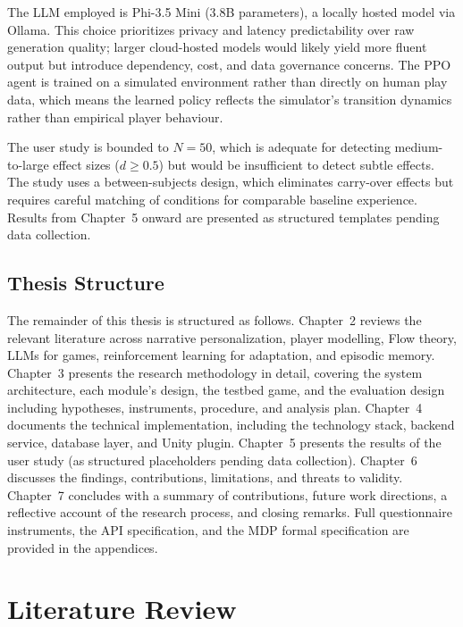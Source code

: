 \documentclass[12pt,a4paper]{report}
\begin{document}
The LLM employed is Phi-3.5 Mini (3.8B parameters), a locally hosted model via Ollama. This choice prioritizes privacy and latency predictability over raw generation quality; larger cloud-hosted models would likely yield more fluent output but introduce dependency, cost, and data governance concerns. The PPO agent is trained on a simulated environment rather than directly on human play data, which means the learned policy reflects the simulator's transition dynamics rather than empirical player behaviour.

The user study is bounded to $N = 50$, which is adequate for detecting medium-to-large effect sizes ($d \geq 0.5$) but would be insufficient to detect subtle effects. The study uses a between-subjects design, which eliminates carry-over effects but requires careful matching of conditions for comparable baseline experience. Results from Chapter~5 onward are presented as structured templates pending data collection.

\section{Thesis Structure}

The remainder of this thesis is structured as follows. Chapter~2 reviews the relevant literature across narrative personalization, player modelling, Flow theory, LLMs for games, reinforcement learning for adaptation, and episodic memory. Chapter~3 presents the research methodology in detail, covering the system architecture, each module's design, the testbed game, and the evaluation design including hypotheses, instruments, procedure, and analysis plan. Chapter~4 documents the technical implementation, including the technology stack, backend service, database layer, and Unity plugin. Chapter~5 presents the results of the user study (as structured placeholders pending data collection). Chapter~6 discusses the findings, contributions, limitations, and threats to validity. Chapter~7 concludes with a summary of contributions, future work directions, a reflective account of the research process, and closing remarks. Full questionnaire instruments, the API specification, and the MDP formal specification are provided in the appendices.


\chapter{Literature Review}
\end{document}
